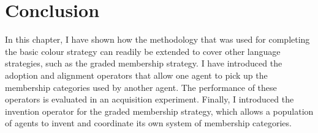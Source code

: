 \section{Conclusion}

In this chapter, I have shown how the methodology that was used for
completing the basic colour strategy can readily be extended to cover
other language strategies, such as the graded membership strategy. I
have introduced the adoption and alignment operators that allow one
agent to pick up the membership categories used by another agent. The
performance of these operators is evaluated in an acquisition
experiment. Finally, I introduced the invention operator for the graded
membership strategy, which allows a population of agents to invent and
coordinate its own system of membership categories.